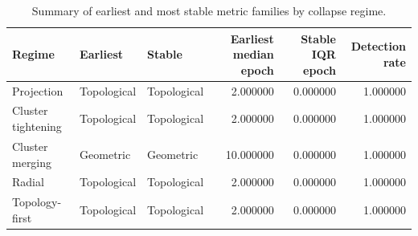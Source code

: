 \begin{table}
\caption{Summary of earliest and most stable metric families by collapse regime.}
\label{tab:earliest-stable-metric-families}
\begin{tabular}{lllrrr}
\toprule
Regime & Earliest & Stable & Earliest median epoch & Stable IQR epoch & Detection rate \\
\midrule
Projection & Topological & Topological & 2.000000 & 0.000000 & 1.000000 \\
Cluster tightening & Topological & Topological & 2.000000 & 0.000000 & 1.000000 \\
Cluster merging & Geometric & Geometric & 10.000000 & 0.000000 & 1.000000 \\
Radial & Topological & Topological & 2.000000 & 0.000000 & 1.000000 \\
Topology-first & Topological & Topological & 2.000000 & 0.000000 & 1.000000 \\
\bottomrule
\end{tabular}
\end{table}
